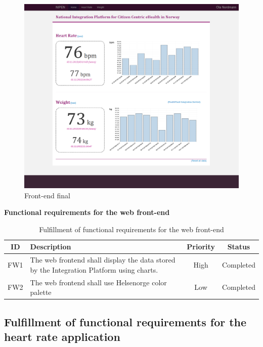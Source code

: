 \begin{figure}[H]
\centering
\includegraphics[scale=0.4]{../Figures/frontend-main-page.png}
\caption{Front-end final}
\label{figure:front-endfinal}
\end{figure}

\textbf{Functional requirements for the web front-end}

\begin{table}[H]
\begin{center}
\begin{tabular}{ | c | p{9cm} | c | c |}
  \hline
  ID & Description & Priority & Status\\
  \hline\noalign{\smallskip}\noalign{\smallskip}\hline
  FW1	& The web frontend shall display the data stored by the Integration Platform using charts.	& High & Completed \\
  FW2	& The web frontend shall use Helsenorge color palette                                       & Low & Completed \\
  \hline
\end{tabular}
\end{center}
\caption{Fulfillment of functional requirements for the web front-end}
\label{table:fulfillemntofwebfront-end}
\end{table}

\subsection{Fulfillment of functional requirements for the heart rate application}

